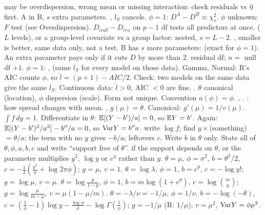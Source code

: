 \sk{} may be overdispersion, wrong mean or missing interaction: check residuals vs $\hat{\eta}$ first.
\sk{} A in B, $s$ extra parameters. , $l_S$ cancels. $\phi=1$: $D^A-D^B\approx\chi^2_s$. $\phi$ unknown: $F$ test (see Overdispersion).  $D_{null}-D_{res}$ on $p-1$ df tests all predictors at once.  ($L$ levels), or a group-level covariate vs a group factor: nested, $s=L-2$.
\sk{} , smaller is better, same data only, not a test. B has $s$ more parameters:  (exact for $\phi=1$). An extra parameter pays only if it cuts $D$ by more than 2.
\sk{} residual df; $n=$ null df $+1$. $\phi=1$: ,  (same $l_S$ for every model on those data). Gamma, Normal: R's AIC counts $\phi$, so $\hat l=(p+1)-AIC/2$. Check: two models on the same data give the same $l_S$. Continuous data: $\hat l>0$, AIC $<0$ are fine.
\bx
{} . $\theta$ canonical (location), $\phi$ dispersion (scale). Form not unique. Convention $a(\phi)=\phi$.
\sk{}, .  : how spread changes with mean.  , $g(\mu)=\theta$. Canonical: $g'(\mu)=1/v(\mu)$.
\sk{} $\int f\,dy=1$. Differentiate in $\theta$: $\mathbb{E}[(Y-b')/a]=0$, so $\mathbb{E} Y=b'$. Again: $\mathbb{E}[(Y-b')^2/a^2]-b''/a=0$, so $\mathrm{Var} Y=b''a$.
\sk{} write $\log f$; find $y\times$(something) $=\theta/a$; the term with no $y$ gives $-b/a$; leftovers $c$. Write $b$ in $\theta$ only.  State all of $\theta,\phi,a,b,c$ and write “support free of $\theta$”.  if the support depends on $\theta$, or the parameter multiplies $y^2$, $\log y$ or $e^y$ rather than $y$.
\li{} $\theta=\mu$, $\phi=\sigma^2$, $b=\theta^2/2$, $c=-\frac12(\frac{y^2}\phi+\log2\pi\phi)$; $g=\mu$, $v=1$.
\li{} $\theta=\log\lambda$, $\phi=1$, $b=e^\theta$, $c=-\log y!$; $g=\log\mu$, $v=\mu$.
\li{} $\theta=\log\frac p{1-p}$, $\phi=1$, $b=m\log(1+e^\theta)$, $c=\log\binom my$; $g=\log\frac\mu{m-\mu}$, $v=\mu(1-\mu/m)$.
\li{} $\theta=-\lambda/\nu=-1/\mu$, $\phi=1/\nu$, $b=-\log(-\theta)$, $c=(\frac1\phi-1)\log y-\frac{\log\phi}\phi-\log\Gamma(\frac1\phi)$; $g=-1/\mu$ (R: $1/\mu$), $v=\mu^2$, $\mathrm{Var} Y=\phi\mu^2$.
